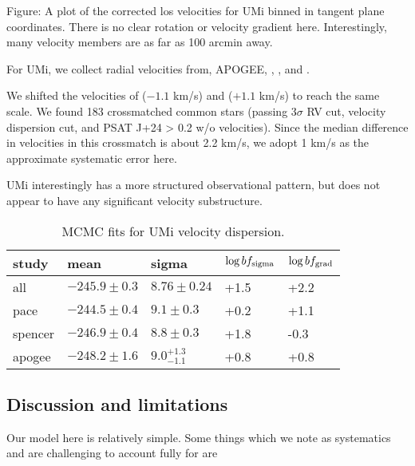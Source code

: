 Figure: A plot of the corrected los velocities for UMi binned in tangent
plane coordinates. There is no clear rotation or velocity gradient here.
Interestingly, many velocity members are as far as 100 arcmin away.

For UMi, we collect radial velocities from, APOGEE,
\citet{sestito+2023b}, \citet{pace+2020}, and \citet{spencer+2018}.

We shifted the velocities of \citet{spencer+2018} (\(-1.1\) km/s) and
\citet{pace+2020} (\(+1.1\) km/s) to reach the same scale. We found 183
crossmatched common stars (passing 3\(\sigma\) RV cut, velocity
dispersion cut, and PSAT J+24 \textgreater{} 0.2 w/o velocities). Since
the median difference in velocities in this crossmatch is about 2.2
km/s, we adopt 1 km/s as the approximate systematic error here.

UMi interestingly has a more structured observational pattern, but does
not appear to have any significant velocity substructure.

\begin{table*}[t]
\centering
\caption{MCMC fits for UMi velocity dispersion.}
\label{tbl:MCMC-fits-for-UMi-velocity-dispersion}
\begin{tabular}{lllll}
\toprule
study & mean & sigma & $\log bf_{\rm sigma}$ & $\log bf_{\rm grad}$\\
\midrule
all & $-245.9\pm0.3$ & $8.76\pm0.24$ & +1.5 & +2.2\\
pace & $-244.5\pm0.4$ & $9.1\pm0.3$ & +0.2 & +1.1\\
spencer & $-246.9\pm0.4$ & $8.8\pm0.3$ & +1.8 & -0.3\\
apogee & $-248.2\pm1.6$ & $9.0_{-1.1}^{+1.3}$ & +0.8 & +0.8\\
\bottomrule
\end{tabular}
\end{table*}

\subsection{Discussion and
limitations}\label{discussion-and-limitations}

Our model here is relatively simple. Some things which we note as
systematics and are challenging to account fully for are

